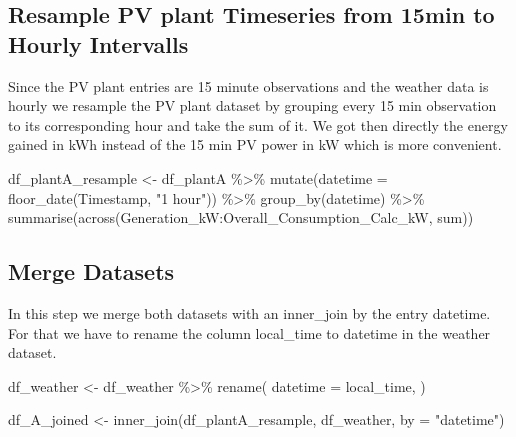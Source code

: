 \documentclass[
]{article}
\newenvironment{Shaded}{\begin{snugshade}}{\end{snugshade}}
\newcommand{\AttributeTok}[1]{\textcolor[rgb]{0.77,0.63,0.00}{#1}}
\newcommand{\FunctionTok}[1]{\textcolor[rgb]{0.00,0.00,0.00}{#1}}
\newcommand{\NormalTok}[1]{#1}
\newcommand{\OtherTok}[1]{\textcolor[rgb]{0.56,0.35,0.01}{#1}}
\newcommand{\SpecialCharTok}[1]{\textcolor[rgb]{0.00,0.00,0.00}{#1}}
\newcommand{\StringTok}[1]{\textcolor[rgb]{0.31,0.60,0.02}{#1}}
\begin{document}
\hypertarget{resample-pv-plant-timeseries-from-15min-to-hourly-intervalls}{%
\subsection{Resample PV plant Timeseries from 15min to Hourly
Intervalls}\label{resample-pv-plant-timeseries-from-15min-to-hourly-intervalls}}

Since the PV plant entries are 15 minute observations and the weather
data is hourly we resample the PV plant dataset by grouping every 15 min
observation to its corresponding hour and take the sum of it. We got
then directly the energy gained in kWh instead of the 15 min PV power in
kW which is more convenient.

\begin{Shaded}
\begin{Highlighting}[]
\NormalTok{df\_plantA\_resample }\OtherTok{\textless{}{-}}\NormalTok{ df\_plantA }\SpecialCharTok{\%\textgreater{}\%}
  \FunctionTok{mutate}\NormalTok{(}\AttributeTok{datetime =} \FunctionTok{floor\_date}\NormalTok{(Timestamp, }\StringTok{"1 hour"}\NormalTok{)) }\SpecialCharTok{\%\textgreater{}\%}
  \FunctionTok{group\_by}\NormalTok{(datetime) }\SpecialCharTok{\%\textgreater{}\%}
  \FunctionTok{summarise}\NormalTok{(}\FunctionTok{across}\NormalTok{(Generation\_kW}\SpecialCharTok{:}\NormalTok{Overall\_Consumption\_Calc\_kW, sum)) }
\end{Highlighting}
\end{Shaded}

\hypertarget{merge-datasets}{%
\subsection{Merge Datasets}\label{merge-datasets}}

In this step we merge both datasets with an inner\_join by the entry
datetime. For that we have to rename the column local\_time to datetime
in the weather dataset.

\begin{Shaded}
\begin{Highlighting}[]
\NormalTok{df\_weather }\OtherTok{\textless{}{-}}\NormalTok{ df\_weather }\SpecialCharTok{\%\textgreater{}\%} 
  \FunctionTok{rename}\NormalTok{(}
    \AttributeTok{datetime =}\NormalTok{ local\_time,}
\NormalTok{    )}
\end{Highlighting}
\end{Shaded}

\begin{Shaded}
\begin{Highlighting}[]
\NormalTok{df\_A\_joined }\OtherTok{\textless{}{-}} \FunctionTok{inner\_join}\NormalTok{(df\_plantA\_resample, df\_weather, }\AttributeTok{by =} \StringTok{"datetime"}\NormalTok{)}
\end{Highlighting}
\end{Shaded}
\end{document}
